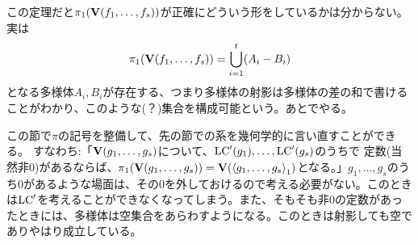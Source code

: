 \documentclass[9pt]{ltjsarticle}
\begin{document}
この定理だと$\pi_1(\textbf V(f_1,\dots,f_s))$が正確にどういう形をしているかは分からない。
実は
\begin{align}
  \pi_1(\textbf V(f_1,\dots,f_s)) = \bigcup_{i=1}^t (A_i - B_i)
\end{align}
となる多様体$A_i,B_i$が存在する、つまり多様体の射影は多様体の差の和で書けることがわかり、このような(？)集合を構成可能という。あとでやる。

この節で$\pi$の記号を整備して、先の節での系を幾何学的に言い直すことができる。
すなわち:「$\textbf V(g_1,\dots,g_s)$について、${\rm LC}'(g_1),\dots,{\rm LC}'(g_s)$のうちで
定数(当然非0)があるならば、$\pi_1(\textbf V(g_1,\dots,g_s)) = \textbf V(\left\langle g_1,\dots,g_s \right\rangle_1)$となる。」$g_1,\dots,g_s$のうち0があるような場面は、その0を外しておけるので考える必要がない。このときは${\rm LC}'$を考えることができなくなってしまう。また、そもそも非0の定数があったときには、多様体は空集合をあらわすようになる。このときは射影しても空でありやはり成立している。





 
\end{document}
